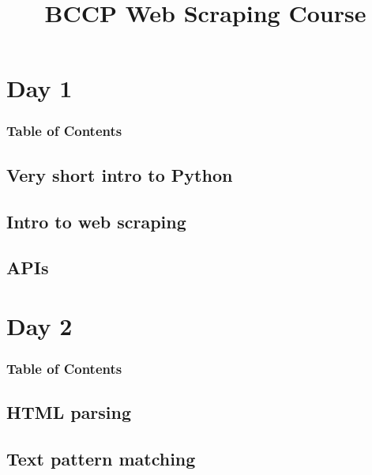 \documentclass[english,aspectratio=169]{beamer}
\begin{document}
\title[Web scraping]{BCCP Web Scraping Course}
\titlegraphic{}


\date[]{}

\begin{frame}
    \titlepage
\end{frame}

\section{Day 1}
\label{sec:day1}


\begin{frame}
    \frametitle{Table of Contents}
    \tableofcontents[currentsection]
\end{frame}

\subsection{Very short intro to Python}
\label{sec:intropython}


\subsection{Intro to web scraping}
\label{sec:introwebscraping}



\subsection{APIs}
\label{sec:apis}


\section{Day 2}

\begin{frame}
    \frametitle{Table of Contents}
    \tableofcontents[currentsection]
\end{frame}

\subsection{HTML parsing}



\subsection{Text pattern matching}
\end{document}
